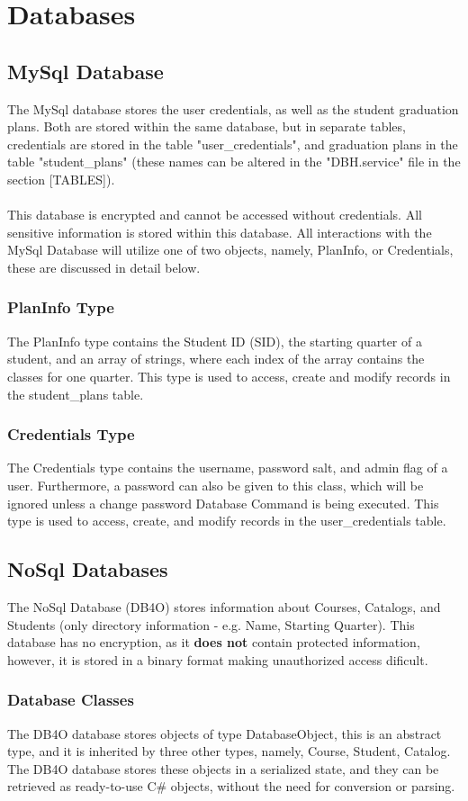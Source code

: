 \documentclass[letterpaper]{report}
\begin{document}
	\chapter{Databases}
	\section{MySql Database}
	The MySql database stores the user credentials, as well as the student graduation plans. Both are stored within the same database, but in separate tables, credentials are stored in the table "user\_credentials", and graduation plans in the table "student\_plans" (these names can be altered in the "DBH.service" file in the section [TABLES]).\\ \\This database is encrypted and cannot be accessed without credentials. All sensitive information is stored within this database.
	All interactions with the MySql Database will utilize one of two objects, namely, PlanInfo, or Credentials, these are discussed in detail below.
	\subsection{PlanInfo Type}
	The PlanInfo type contains the Student ID (SID), the starting quarter of a student, and an array of strings, where each index of the array contains the classes for one quarter. This type is used to access, create and modify records in the student\_plans table. 
	\subsection{Credentials Type}
	The Credentials type contains the username, password salt, and admin flag of a user. Furthermore, a password can also be given to this class, which will be ignored unless a change password Database Command is being executed. This type is used to access, create, and modify records in the user\_credentials table.
	\section{NoSql Databases}
	The NoSql Database (DB4O) stores information about Courses, Catalogs, and Students (only directory information - e.g. Name, Starting Quarter). This database has no encryption, as it \textbf{does not} contain protected information, however, it is stored in a binary format making unauthorized access dificult.
	\subsection{Database Classes}
	The DB4O database stores objects of type DatabaseObject, this is an abstract type, and it is inherited by three other types, namely, Course, Student, Catalog. The DB4O database stores these objects in a serialized state, and they can be retrieved as ready-to-use C\# objects, without the need for conversion or parsing. 
\end{document}
